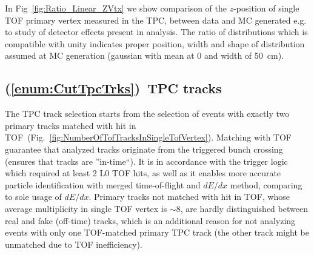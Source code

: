 In Fig~\ref{fig:Ratio_Linear_ZVtx} we show comparison of the $z$-position of single TOF primary vertex measured in the TPC, between data and MC generated e.g. to study of detector effects present in analysis. The ratio of distributions which is compatible with unity indicates proper position, width and shape of distribution assumed at MC generation (gaussian with mean at 0 and width of 50~cm).




\subsection{(\ref{enum:CutTpcTrks})~TPC tracks}\label{sec:C3}

The TPC track selection starts from the selection of events with exactly two primary tracks matched with hit in TOF~(Fig.~\ref{fig:NumberOfTofTracksInSingleTofVertex}). Matching with TOF guarantee that analyzed tracks originate from the triggered bunch crossing (ensures that tracks are ''in-time``). It is in accordance with the trigger logic which required at least 2 L0 TOF hits, as well as it enables more accurate particle identification with merged time-of-flight and $dE/dx$ method, comparing to sole usage of $dE/dx$. Primary tracks not matched with hit in TOF, whose average multiplicity in single TOF vertex is $\sim$8, are hardly distinguished between real and fake (off-time) tracks, which is an additional reason for not analyzing events with only one TOF-matched primary TPC track (the other track might be unmatched due to TOF inefficiency).

